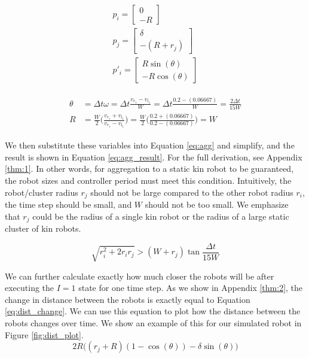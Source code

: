 \documentclass[conference]{IEEEtran}
\begin{document}
    \begin{equation} \label{eq:vars}
      \begin{split}
        p_i = \begin{bmatrix}0 \\ -R\end{bmatrix} \\
        p_j = \begin{bmatrix}\delta \\ -(R+r_j)\end{bmatrix} \\
        p'_i = \begin{bmatrix}R\sin(\theta) \\ -R\cos(\theta)\end{bmatrix}
      \end{split}
    \end{equation}

    \begin{align}
      \begin{split} \label{eq:theta_and_r}
        \theta &= \Delta t\omega = \Delta t \frac{v_{r_1} - v_{l_1}}{W} = \Delta t \frac{0.2 - (0.06667)}{W} = \frac{2\Delta t}{15W} \\
        R &= \frac{W}{2}\bigg(\frac{v_{r_1} + v_{l_1}}{v_{r_1} - v_{l_1}}\bigg) = \frac{W}{2}\bigg(\frac{0.2 + (0.06667)}{0.2 - (0.06667)}\bigg) = W
      \end{split}
    \end{align}

    We then substitute these variables into Equation \eqref{eq:agg} and simplify, and the result is shown in Equation \eqref{eq:agg_result}. For the full derivation, see Appendix \ref{thm:1}. In other words, for aggregation to a static kin robot to be guaranteed, the robot sizes and controller period must meet this condition. Intuitively, the robot/cluster radius $r_j$ should not be large compared to the other robot radius $r_i$, the time step should be small, and $W$ should not be too small. We emphasize that $r_j$ could be the radius of a single kin robot or the radius of a large static cluster of kin robots.

    \begin{equation} \label{eq:agg_result}
      \sqrt{r^2_i + 2r_ir_j} > (W+r_j)\tan{\frac{\Delta t}{15W}}
    \end{equation}

    We can further calculate exactly how much closer the robots will be after executing the $I=1$ state for one time step. As we show in Appendix \ref{thm:2}, the change in distance between the robots is exactly equal to Equation \eqref{eq:dist_change}. We can use this equation to plot how the distance between the robots changes over time. We show an example of this for our simulated robot in Figure \ref{fig:dist_plot}.
    \begin{equation} \label{eq:dist_change}
      2R\big((r_j + R)(1 - \cos(\theta))-\delta\sin(\theta)\big)
    \end{equation}
\end{document}
